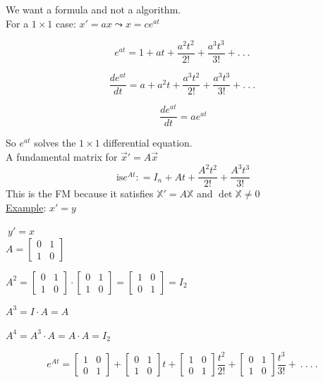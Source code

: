 \documentclass[12pt]{article}
\numberwithin{equation}{subsection}
\newcommand{\indd}{\hspace{2cm}}
\newcommand{\indr}{\hspace{9cm}}
\newcommand{\exa}{\noindent \underline{Example}: \hspace{1cm}}
\begin{document}
\indd We want a formula and not a algorithm.\\

For a $ 1 \times 1 $ case: $x'=ax \leadsto x=ce^{at}$

$$e^{at} = 1 + at + \frac{a^2t^2}{2!}+\frac{a^3t^3}{3!}+ .\ .\ .\ $$

$$\frac{de^{at}}{dt} = a + a^2t + \frac{a^3t^2}{2!}+\frac{a^3t^3}{3!}+ .\ .\ .\ $$

$$ \frac{de^{at}}{dt} =ae^{at}$$

So $e^{at}$ solves the $1 \times 1$ differential equation.\\

A fundamental matrix for $\vec{x}'=A \vec{x}$
\begin{equation}
\textrm{is} e^{At} : = I_n + At + \frac{A^2t^2}{2!} + \frac{A^3t^3}{3!}
\end{equation}
This is the FM because it satisfies $\mathbb{X}'=A\mathbb{X}$ and $\det \mathbb{X} \neq 0$\\

\exa $x'=y$

\indd $\ y'=x$\\

\indr $A=\begin{bmatrix}
0 & 1 \\
1 & 0
\end{bmatrix}$

\indr $A^2=\begin{bmatrix}
0 & 1 \\
1 & 0
\end{bmatrix} \cdot \begin{bmatrix}
0 & 1 \\
1 & 0
\end{bmatrix} = \begin{bmatrix}
1 & 0 \\
0 & 1
\end{bmatrix} = I_2$

\indr $A^3= I \cdot  A = A$

\indr $A^4= A^3 \cdot  A = A \cdot A = I_2$


$$e^{At} =\begin{bmatrix}
1 & 0 \\
0 & 1
\end{bmatrix} +  \begin{bmatrix}
0 & 1 \\
1 & 0
\end{bmatrix} t + \begin{bmatrix}
1 & 0 \\
0 & 1
\end{bmatrix} \frac{t^2}{2!} + \begin{bmatrix}
0 & 1 \\
1 & 0
\end{bmatrix} \frac{t^3}{3!} +\ .\ .\ .\ .\ $$
\end{document}
